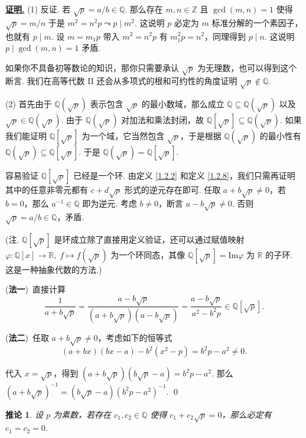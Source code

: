 \documentclass[10pt,openany]{article}
\theoremstyle{thmstyle} %
\theoremstyle{defstyle} %
\newtheorem{corollary}[theorem]{推论}
\theoremstyle{prostyle} %
\theoremstyle{exastyle}
\theoremstyle{remstyle}
\renewenvironment{proof}[1][证明]{\par\underline{\textbf{#1.}} \;\fangsong}{\qed\par}
\begin{document}
\begin{proof}
	(1) 反证. 若 \( \sqrt{p}=a/b \in \mathbb{Q} \). 那么存在 \( m,n \in \mathbb{Z} \) 且 \( \gcd(m,n)=1 \) 使得 \( \sqrt{p}=m/n \) 于是 \(  m^2=n^2p \leadsto p\mid m^2\). 这说明 \( p \) 必定为 \( m \) 标准分解的一个素因子，也就有 \( p \mid m \). 设 \( m=m_1p \) 带入 \( m^2=n^2p \) 有 \( m_1^2p=n^2 \)，同理得到 \( p \mid n \). 这说明 \( p \mid \gcd(m,n)=1 \) 矛盾.
	
	如果你不具备初等数论的知识，那你只需要承认 \( \sqrt{p} \) 为无理数，也可以得到这个断言. 我们在高等代数 II 还会从多项式的根和可约性的角度证明 \( \sqrt{p} \notin \mathbb{Q} \).
	
	(2) 首先由于 \( \mathbb{Q}(\sqrt{p}) \) 表示包含 \( \sqrt{p} \) 的最小数域，那么成立 \( \mathbb{Q} \subseteq \mathbb{Q}(\sqrt{p}) \) 以及 \( \sqrt{p} \in \mathbb{Q}(\sqrt{p}) \). 由于 \( \mathbb{Q}(\sqrt{p}) \) 对加法和乘法封闭，故 \( \mathbb{Q}[\sqrt{p}] \subseteq \mathbb{Q}(\sqrt{p}) \). 如果我们能证明 \( \mathbb{Q}[\sqrt{p}] \) 为一个域，它当然包含 \( \sqrt{p} \)，于是根据 \( \mathbb{Q}(\sqrt{p}) \) 的最小性有 \( \mathbb{Q}(\sqrt{p}) \subseteq \mathbb{Q}[\sqrt{p}] \). 于是 \( \mathbb{Q}(\sqrt{p})= \mathbb{Q}[\sqrt{p}] \).
	
	容易验证  \( \mathbb{Q}[\sqrt{p}] \) 已经是一个环. 由定义 \ref{1.2.2} 和定义 \ref{1.2.8}，我们只需再证明其中的任意非零元都有 \( c+d\sqrt{p} \) 形式的逆元存在即可. 任取 \( a+b\sqrt{p} \neq 0 \)，若 \(  b=0 \)，那么 \( a^{-1} \in \mathbb{Q} \) 即为逆元. 考虑 \( b \neq 0 \)，断言 \( a-b\sqrt{p} \neq 0 \).
	否则 \( \sqrt{p}=a/b \in \mathbb{Q} \)，矛盾.
	
	(注. \( \mathbb{Q}[\sqrt{p}] \) 是环成立除了直接用定义验证，还可以通过赋值映射 \( \varphi: \mathbb{Q}[x] \to \mathbb{R}, \; f \mapsto f(\sqrt{p}) \) 为一个环同态，其像 \( \mathbb{Q}[\sqrt{p}]=\mathrm{Im}\varphi \) 为 \( \mathbb{R} \) 的子环. 这是一种抽象代数的方法.)
	
	(\textbf{法一})\ 直接计算
	\[ \frac{1}{a+b\sqrt{p}}=\frac{a-b\sqrt{p}}{(a+b\sqrt{p})(a-b\sqrt{p})}= \frac{a-b\sqrt{p}}{a^2-b^2p} \in \mathbb{Q}[\sqrt{p}]. \]
	
	(\textbf{法二})\ 任取 \( a+b\sqrt{p} \neq 0 \)，考虑如下的恒等式
	\[ (a+bx)(bx-a)-b^2(x^2-p)=b^2p-a^2 \neq 0. \]
	
	代入 \( x=\sqrt{p} \)，得到 \( (a+b\sqrt{p})(b\sqrt{p}-a)=b^2p-a^2 \). 那么 \( (a+b\sqrt{p})^{-1}=(b\sqrt{p}-a)(b^2p-a^2)^{-1} \).
\end{proof}

\begin{corollary}	\label{1.2.13}
	设 \( p \) 为素数，若存在 \( c_1,c_2 \in \mathbb{Q} \) 使得 \( c_1+c_2\sqrt{p}=0 \)，那么必定有 \( c_1=c_2=0 \).

\end{corollary}
\end{document}
